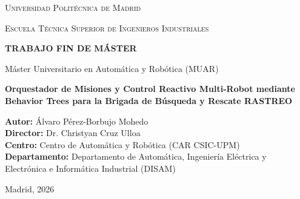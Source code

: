\documentclass[11pt,a4paper,twoside]{book}
\newcommand{\tfmTitulo}{Orquestador de Misiones y Control Reactivo Multi-Robot mediante Behavior Trees para la Brigada de Búsqueda y Rescate RASTREO}
\newcommand{\tfmAutor}{Álvaro Pérez-Borbujo Mohedo}
\newcommand{\tfmDirector}{Dr. Christyan Cruz Ulloa}
\newcommand{\tfmMaster}{Máster Universitario en Automática y Robótica (MUAR)}
\newcommand{\tfmDepartamento}{Departamento de Automática, Ingeniería Eléctrica y Electrónica e Informática Industrial (DISAM)}
\newcommand{\tfmCentro}{Centro de Automática y Robótica (CAR CSIC-UPM)}
\newcommand{\tfmFecha}{Madrid, 2026}
\begin{document}
\frontmatter

\begin{titlepage}
    \centering
    {\scshape\LARGE Universidad Politécnica de Madrid \par}
    \vspace{0.3cm}
    {\scshape\Large Escuela Técnica Superior de Ingenieros Industriales \par}
    \vspace{1.5cm}
    
    \vspace{1.5cm}
    
    {\Large\textbf{TRABAJO FIN DE MÁSTER}\par}
    \vspace{0.5cm}
    {\large \tfmMaster \par}
    \vspace{1.5cm}
    
    {\Huge\bfseries\color{upmblue} \tfmTitulo \par}
    \vspace{2cm}
    
    \begin{flushright}
        \textbf{Autor:} \tfmAutor \\
        \textbf{Director:} \tfmDirector \\
        \textbf{Centro:} \tfmCentro \\
        \textbf{Departamento:} \tfmDepartamento
    \end{flushright}
    
    \vfill
    {\large \tfmFecha \par}
\end{titlepage}

\tableofcontents
\listoffigures
\listoftables

\mainmatter










\backmatter
% 
% 
\end{document}
